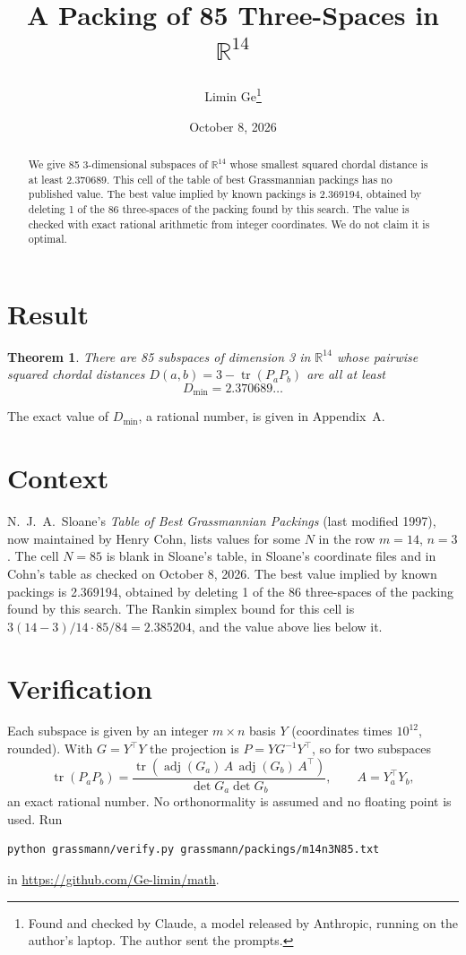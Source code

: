 \documentclass[11pt,a4paper]{article}
\title{A Packing of 85 Three-Spaces in $\mathbb{R}^{14}$}
\author{Limin Ge\thanks{Found and checked by Claude, a model released by Anthropic, running on the author's laptop. The author sent the prompts.}}
\date{October 8, 2026}
\newtheorem*{theorem}{Theorem}
\begin{document}
\maketitle
\begin{abstract}
We give 85 3-dimensional subspaces of $\mathbb{R}^{14}$ whose smallest squared chordal distance is at least 2.370689. This cell of the table of best Grassmannian packings has no published value. The best value implied by known packings is 2.369194, obtained by deleting 1 of the 86 three-spaces of the packing found by this search. The value is checked with exact rational arithmetic from integer coordinates. We do not claim it is optimal.
\end{abstract}

\section{Result}
\begin{theorem}
There are 85 subspaces of dimension 3 in $\mathbb{R}^{14}$ whose pairwise squared chordal distances $D(a,b) = 3 - \operatorname{tr}(P_aP_b)$ are all at least
\[ D_{\min} = 2.370689\ldots \]
\end{theorem}
The exact value of $D_{\min}$, a rational number, is given in Appendix~A.


\section{Context}
N.~J.~A.~Sloane's \emph{Table of Best Grassmannian Packings} (last modified 1997), now maintained by Henry Cohn, lists values for some $N$ in the row $m=14$, $n=3$. The cell $N=85$ is blank in Sloane's table, in Sloane's coordinate files and in Cohn's table as checked on October 8, 2026. The best value implied by known packings is 2.369194, obtained by deleting 1 of the 86 three-spaces of the packing found by this search. The Rankin simplex bound for this cell is $3(14-3)/14\cdot 85/84 = 2.385204$, and the value above lies below it.


\section{Verification}
Each subspace is given by an integer $m\times n$ basis $Y$ (coordinates times $10^{12}$, rounded). With $G=Y^\top Y$ the projection is $P=YG^{-1}Y^\top$, so for two subspaces
\[ \operatorname{tr}(P_aP_b)=\frac{\operatorname{tr}(\operatorname{adj}(G_a)\,A\,\operatorname{adj}(G_b)\,A^\top)}{\det G_a\det G_b},\qquad A=Y_a^\top Y_b, \]
an exact rational number. No orthonormality is assumed and no floating point is used. Run
\begin{verbatim}
python grassmann/verify.py grassmann/packings/m14n3N85.txt
\end{verbatim}
in \url{https://github.com/Ge-limin/math}.
\end{document}
